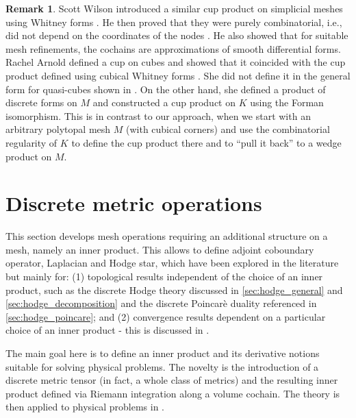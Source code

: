 \documentclass{elsarticle}
\theoremstyle{definition}
\newtheorem{remark}[theorem]{Remark}
\begin{document}
\begin{remark}
\label{thm:whitney_wilson_arnold}
  Scott Wilson introduced a similar cup product on simplicial meshes \cite[Definition 5.1]{wilson2007cochain} using Whitney forms \cite{whitney1957geometric}. He then proved that they were purely combinatorial, i.e., did not depend on the coordinates of the nodes \cite[Theorem 5.2]{wilson2007cochain}. He also showed that for suitable mesh refinements, the cochains are approximations of smooth differential forms. Rachel Arnold defined a cup on cubes \cite[Definition 3.2.1]{arnold2012discrete} and showed \cite[Theorem 3.2.12]{arnold2012discrete} that it coincided with the cup product defined using cubical Whitney forms \cite[Definition 3.2.10]{arnold2012discrete}. She did not define it in the general form for quasi-cubes shown in . On the other hand, she defined a product of discrete forms on $M$ \cite[Definition 5.4.1]{arnold2012discrete} and constructed a cup product on $K$ \cite[Definition 5.4.3]{arnold2012discrete} using the Forman isomorphism. This is in contrast to our approach, when we start with an arbitrary polytopal mesh $M$ (with cubical corners) and use the combinatorial regularity of $K$ to define the cup product there and to ``pull it back'' to a wedge product on $M$.
\end{remark}

\section{Discrete metric operations}
\label{sec:geometry}
This section develops mesh operations requiring an additional structure on a mesh, namely an inner product. This allows to define adjoint coboundary operator, Laplacian and Hodge star, which have been explored in the literature but mainly for: (1) topological results independent of the choice of an inner product, such as the discrete Hodge theory discussed in \ref{sec:hodge_general} and \ref{sec:hodge_decomposition} and the discrete Poincar\`e duality referenced in \ref{sec:hodge_poincare}; and (2) convergence results dependent on a particular choice of an inner product - this is discussed in \cite{wilson2007cochain}. 

The main goal here is to define an inner product and its derivative notions suitable for solving physical problems. The novelty is the introduction of a discrete metric tensor (in fact, a whole class of metrics) and the resulting inner product defined via Riemann integration along a volume cochain. The theory is then applied to physical problems in .
\end{document}
